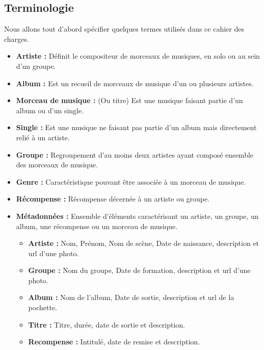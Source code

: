     \subsection{Terminologie}

        \begin{paragraphe}
            Nous allons tout d'abord spécifier quelques termes utilisés dans ce cahier des charges.
            \begin{itemize}
                \item \textbf{Artiste :} Définit le compositeur de morceaux de musiques, en solo ou au sein d'un groupe.
                \item \textbf{Album :} Est un recueil de morceaux de musique d'un ou plusieurs artistes.
                \item \textbf{Morceau de musique :} (Ou titre) Est une musique faisant partie d'un album ou d'un single.
                \item \textbf{Single :} Est une musique ne faisant pas partie d'un album mais directement relié à un artiste.
                \item \textbf{Groupe :} Regroupement d'au moins deux artistes ayant composé ensemble des morceaux de musique.
                \item \textbf{Genre :} Caractéristique pouvant être associée à un morceau de musique.
                \item \textbf{Récompense :} Récompense décernée à un artiste ou groupe.
                \item \textbf{Métadonnées :} Ensemble d'éléments caractérisant un artiste, un groupe, un album, une récompense ou un morceau de musique.
                \begin{itemize}
                    \item \textbf{Artiste :} Nom, Prénom, Nom de scène, Date de naissance, description et url d'une photo.
                    \item \textbf{Groupe :} Nom du groupe, Date de formation, description et url d'une photo.
                    \item \textbf{Album :} Nom de l'album, Date de sortie, description et url de la pochette.
                    \item \textbf{Titre :} Titre, durée, date de sortie et description.
                    \item \textbf{Recompense :} Intitulé, date de remise et description.
                \end{itemize}
            \end{itemize}
        \end{paragraphe}

